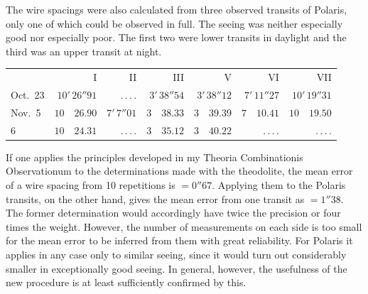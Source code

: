 The wire spacings were also calculated from three observed transits of Polaris, only one of which could be observed in full. The seeing was neither especially good nor especially poor. The first two were lower transits in daylight and the third was an upper transit at night.

\begin{center}
\begingroup\small\setlength{\tabcolsep}{4pt}
\begin{tabular}{l|r|r|r|r|r|r}
 & I & II & III & V & VI & VII \\
Oct.\ 23 & $10'\,26''91$ & .\,.\,.\,. & $3'\,38''54$ & $3'\,38''12$ & $7'\,11''27$ & $10'\,19''31$ \\
Nov.\ 5 & $10\quad26.90$ & $7'\,7''01$ & $3\quad38.33$ & $3\quad39.39$ & $7\quad10.41$ & $10\quad19.50$ \\
\phantom{Nov.\ }6 & $10\quad24.31$ & .\,.\,.\,. & $3\quad35.12$ & $3\quad40.22$ & .\,.\,.\,. & .\,.\,.\,. \\
\end{tabular}
\endgroup
\end{center}

If one applies the principles developed in my Theoria Combinationis Observationum to the determinations made with the theodolite, the mean error of a wire spacing from 10 repetitions is $= 0''67$. Applying them to the Polaris transits, on the other hand, gives the mean error from one transit as $= 1''38$. The former determination would accordingly have twice the precision or four times the weight. However, the number of measurements
%
on each side is too small for the mean error to be inferred from them with great reliability. For Polaris it applies in any case only to similar seeing, since it would turn out considerably smaller in exceptionally good seeing. In general, however, the usefulness of the new procedure is at least sufficiently confirmed by this.

